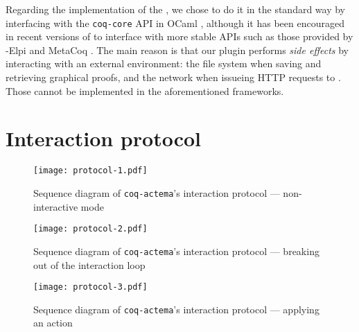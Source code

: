 Regarding the implementation of the , we chose to do it in the
standard way by interfacing with the \texttt{coq-core} API in OCaml
, although it has been encouraged in recent versions of  to
interface with more stable APIs such as those provided by -Elpi
 and MetaCoq . The main
reason is that our plugin performs \emph{side effects} by interacting with an
external environment: the file system when saving and retrieving graphical
proofs, and the network when issueing HTTP requests to . Those cannot be
implemented in the aforementioned frameworks.

\section{Interaction protocol}

\begin{figure*}
  \texttt{[image: protocol-1.pdf]}
  \vspace{2em}
  \caption{Sequence diagram of \texttt{coq-actema}'s interaction protocol ---
  non-interactive mode}
\end{figure*}

\begin{figure*}
  \texttt{[image: protocol-2.pdf]}
  \vspace{2em}
  \caption{Sequence diagram of \texttt{coq-actema}'s interaction protocol ---
    breaking out of the interaction loop}
\end{figure*}

\begin{figure*}
  \texttt{[image: protocol-3.pdf]}
  \vspace{2em}
  \caption{Sequence diagram of \texttt{coq-actema}'s interaction protocol ---
    applying an action}
\end{figure*}

